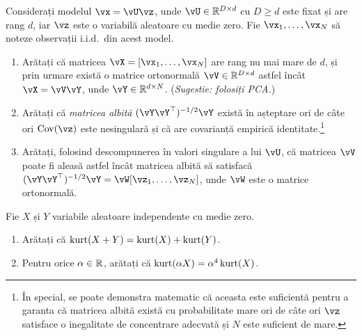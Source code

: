 \documentclass[../../book-main_ro.tex]{subfiles}
\begin{document}
\begin{exercise}\label{exercise:whitening}
    Considerați modelul $\vx = \vU \vz$, unde $\vU \in \R^{D \times d}$ cu $D \geq d$ este fixat și are rang $d$, iar $\vz$ este o variabilă aleatoare cu medie zero. Fie $\vx_1, \dots, \vx_N$ să noteze observații i.i.d.\ din acest model.
    \begin{enumerate}
        \item Arătați că matricea $\vX = [\vx_1, \dots, \vx_N]$ are rang nu mai mare de $d$, și prin urmare există o matrice ortonormală $\vV \in \R^{D \times d}$ astfel încât $\vX = \vV \vY$, unde $\vY \in \R^{d \times N}$. (\textit{Sugestie: folosiți PCA.})
        \item Arătați că \textit{matricea albită} $(\vY \vY^\top)^{-1/2}\vY$ există în așteptare ori de câte ori $\Cov(\vz)$ este nesingulară și că are covarianță empirică identitate.\footnote{În special, se poate demonstra matematic că aceasta este suficientă pentru a garanta că matricea albită există cu probabilitate mare ori de câte ori $\vz$ satisface o inegalitate de concentrare adecvată și $N$ este suficient de mare.}
        \item Arătați, folosind descompunerea în valori singulare a lui $\vU$, că matricea $\vV$ poate fi aleasă astfel încât matricea albită să satisfacă $(\vY \vY^\top)^{-1/2} \vY = \vW [\vz_1, \dots, \vz_N]$, unde $\vW$ este o matrice ortonormală.
    \end{enumerate}
\end{exercise}

\begin{exercise}\label{exercise:kurtosis-linearity-properties}
    Fie $X$ și $Y$ variabile aleatoare independente cu medie zero.
    \begin{enumerate}
        \item Arătați că $\mathop{\mathrm{kurt}}(X + Y) = \mathop{\mathrm{kurt}}(X) + \mathop{\mathrm{kurt}}(Y)$.
        \item Pentru orice $\alpha \in \mathbb{R}$, arătați că $\mathop{\mathrm{kurt}}(\alpha X) = \alpha^4 \mathop{\mathrm{kurt}}(X)$.
    \end{enumerate}
\end{exercise}
\end{document}

